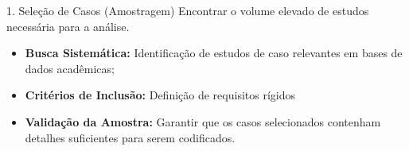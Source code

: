 \begin{frame}{1. Seleção de Casos (Amostragem)}
    \justifying
   Encontrar o volume elevado de estudos necessária para a análise.

    \vspace{0.8em}
    \begin{itemize}
        \item \textbf{Busca Sistemática:} Identificação de estudos de caso relevantes em bases de dados acadêmicas;
        \item \textbf{Critérios de Inclusão:} Definição de requisitos rígidos
        \item \textbf{Validação da Amostra:} Garantir que os casos selecionados contenham detalhes suficientes para serem codificados.
    \end{itemize}
    
\end{frame}